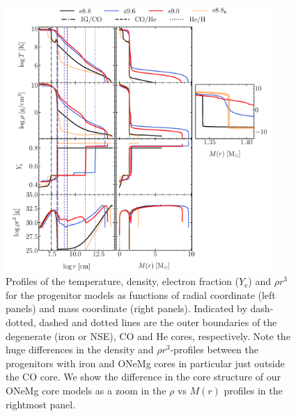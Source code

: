 \documentclass[fleqn,usenatbib]{mnras}
\begin{document}
\begin{figure} %
 \centering
 \includegraphics[width=0.9\textwidth,trim=1cm 0.0cm 1cm 0cm]{./pic/progenitors_tem_rho_ye_rhor_paper.pdf}
 \caption{Profiles of the temperature, density, electron 
 fraction ($Y_{\text{e}}$) and $\rho r^3$ for the progenitor 
 models as functions of radial coordinate (left panels) and mass 
 coordinate (right panels). Indicated by dash-dotted, dashed and 
 dotted lines are the outer boundaries of the degenerate 
 (iron or NSE), CO and He 
 cores, respectively. Note the huge differences in the density 
 and $\rho r^3$-profiles between the progenitors with iron 
 and ONeMg cores in particular just outside the CO core. 
 We show the difference in the 
 core structure of our ONeMg core models as a zoom in the $\rho$ vs $M(r)$
 profiles in the rightmost panel.}
 \label{fig:prog_tem_rho_ye_rhor}
\end{figure}
\end{document}
